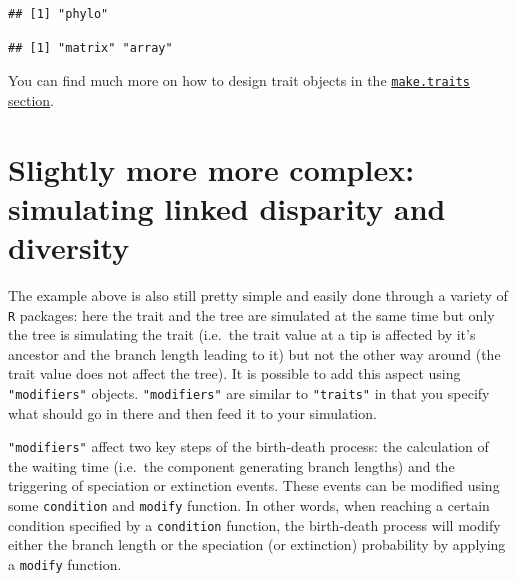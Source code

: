 \documentclass[
]{book}
\newenvironment{Shaded}{\begin{snugshade}}{\end{snugshade}}
\newcommand{\CommentTok}[1]{\textcolor[rgb]{0.56,0.35,0.01}{\textit{#1}}}
\newcommand{\KeywordTok}[1]{\textcolor[rgb]{0.13,0.29,0.53}{\textbf{#1}}}
\newcommand{\NormalTok}[1]{#1}
\newcommand{\OperatorTok}[1]{\textcolor[rgb]{0.81,0.36,0.00}{\textbf{#1}}}
\newcommand{\StringTok}[1]{\textcolor[rgb]{0.31,0.60,0.02}{#1}}
\begin{document}
\begin{Shaded}
\end{Shaded}

\begin{verbatim}
## [1] "phylo"
\end{verbatim}

\begin{Shaded}
\end{Shaded}

\begin{verbatim}
## [1] "matrix" "array"
\end{verbatim}

You can find much more on how to design trait objects in the \protect\hyperlink{maketraits}{\texttt{make.traits} section}.

\hypertarget{slightly-more-more-complex-simulating-linked-disparity-and-diversity}{%
\section{Slightly more more complex: simulating linked disparity and diversity}\label{slightly-more-more-complex-simulating-linked-disparity-and-diversity}}

The example above is also still pretty simple and easily done through a variety of \texttt{R} packages: here the trait and the tree are simulated at the same time but only the tree is simulating the trait (i.e.~the trait value at a tip is affected by it's ancestor and the branch length leading to it) but not the other way around (the trait value does not affect the tree).
It is possible to add this aspect using \texttt{"modifiers"} objects.
\texttt{"modifiers"} are similar to \texttt{"traits"} in that you specify what should go in there and then feed it to your simulation.

\texttt{"modifiers"} affect two key steps of the birth-death process: the calculation of the waiting time (i.e.~the component generating branch lengths) and the triggering of speciation or extinction events.
These events can be modified using some \texttt{condition} and \texttt{modify} function.
In other words, when reaching a certain condition specified by a \texttt{condition} function, the birth-death process will modify either the branch length or the speciation (or extinction) probability by applying a \texttt{modify} function.
\end{document}
